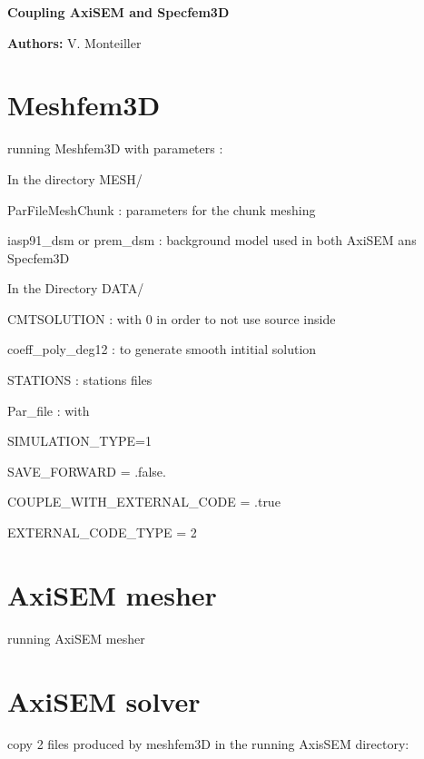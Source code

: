 \documentclass[a4paper,11pt]{article}
\begin{document}
{\centerline{\bf{Coupling AxiSEM and Specfem3D}}}
{\bf{Authors:}} V. Monteiller

\section{Meshfem3D}

running Meshfem3D with parameters : \newline

In the directory MESH/ \newline

ParFileMeshChunk  : parameters for the chunk meshing \newline

iasp91\_dsm or prem\_dsm : background model used in both AxiSEM ans Specfem3D \newline


In the Directory DATA/  \newline

CMTSOLUTION  : with 0 in order to not use source inside \newline

coeff\_poly\_deg12 : to generate smooth intitial solution  \newline

STATIONS  : stations files  \newline

Par\_file : with \newline

SIMULATION\_TYPE=1 \newline

SAVE\_FORWARD = .false. \newline

COUPLE\_WITH\_EXTERNAL\_CODE = .true \newline

EXTERNAL\_CODE\_TYPE    = 2 \newline

\section{AxiSEM mesher}

running AxiSEM mesher

\section{AxiSEM solver}
copy 2 files produced by meshfem3D in the running AxisSEM directory: \newline
\end{document}
